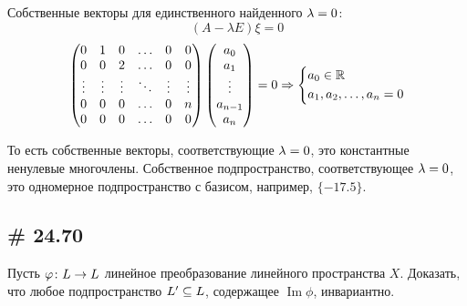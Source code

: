 \documentclass[a4paper,12pt]{article}
\DeclareMathOperator{\Imag}{Im}
\begin{document}
\begin{solution}
    Собственные векторы для единственного найденного $\lambda \hm= 0$:
    \[
      (A - \lambda E) \xi = 0
    \]
    \[
      \begin{pmatrix}
        0      & 1      & 0      & \ldots & 0      & 0\\
        0      & 0      & 2      & \ldots & 0      & 0\\
        \vdots & \vdots & \vdots & \ddots & \vdots & \vdots\\
        0      & 0      & 0      & \ldots & 0      & n\\
        0      & 0      & 0      & \ldots & 0      & 0
      \end{pmatrix} \begin{pmatrix}
        a_0\\
        a_1\\
        \vdots\\
        a_{n - 1}\\
        a_n
      \end{pmatrix} = 0
      \Rightarrow \left\{
        \begin{aligned}
          &a_0 \in \operatorname{\mathbb R}\\
          &a_1, a_2, \ldots, a_n = 0
        \end{aligned}
      \right.
    \]
    
    То есть собственные векторы, соответствующие $\lambda \hm= 0$, это константные ненулевые многочлены.
    Собственное подпространство, соответствующее $\lambda \hm= 0$, это одномерное подпространство с базисом, например, $\{-17.5\}$.
  \end{solution}
  
  
  \subsection{\# 24.70}
  
  Пусть $\phi\colon L \hm\to L$ линейное преобразование линейного пространства $X$.
  Доказать, что любое подпространство $L' \hm\subseteq L$, содержащее $\Imag\phi$, инвариантно.
  
\end{document}
